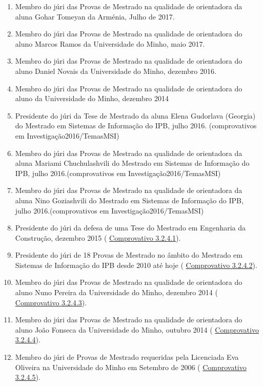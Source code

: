 \documentclass[11pt]{article}
\begin{document}
\begin{enumerate}
\item{Membro do júri das Provas de Mestrado  na qualidade de orientadora da aluna Gohar Tomeyan da Arménia, Julho de 2017.}
\item{Membro do júri das Provas de Mestrado na qualidade de orientadora do aluno Marcos Ramos da Universidade do Minho, maio 2017.}
\item{Membro do júri das Provas de Mestrado na qualidade de orientadora do aluno Daniel Novais da Universidade do Minho, dezembro 2016.}
\item{Membro do júri das Provas de Mestrado na qualidade de orientadora do aluno  da Universidade do Minho, dezembro 2014 }
\item{Presidente do júri da Tese de Mestrado da aluna Elena Gudorlava (Georgia) do Mestrado em Sistemas de Informação do IPB, julho 2016. (comprovativos em Investigação2016/TemasMSI)}
\item{Membro do júri das Provas de Mestrado na qualidade de orientadora da aluna Mariami Chuchulashvili do Mestrado em Sistemas de Informação do IPB, julho 2016.(comprovativos em Investigação2016/TemasMSI)}
\item{Membro do júri das Provas de Mestrado na qualidade de orientadora da aluna Nino Goziashvili do Mestrado em Sistemas de Informação do IPB, julho 2016.(comprovativos em Investigação2016/TemasMSI)}
\item{Presidente do júri da defesa de uma Tese do Mestrado em Engenharia da Construção, dezembro 2015 (
\href{run:JuriProvas/PresidenteMEC.pdf}{Comprovativo 3.2.4.1}).}
\item{Presidente do júri de 18 Provas de Mestrado no âmbito do Mestrado em Sistemas de Informação do IPB desde 2010 até hoje (
\href{run:JuriProvas/TeseMSI.pdf}{Comprovativo 3.2.4.2}).}
\item{Membro do júri das Provas de Mestrado na qualidade de orientadora do aluno Nuno Pereira da Universidade do Minho, dezembro 2014 (
\href{run:JuriProvas/juriNunoPereira.pdf}{Comprovativo 3.2.4.3}).}
\item{Membro do júri das Provas de Mestrado na qualidade de orientadora do aluno João Fonseca da Universidade do Minho, outubro 2014 (
\href{run:JuriProvas/juriJoaoFonseca.pdf}{Comprovativo 3.2.4.4}).}
\item{Membro do júri de Provas de Mestrado requeridas pela Licenciada Eva Oliveira na Universidade do Minho em Setembro de 2006 (
\href{run:JuriProvas/JuriMestradoEva.pdf}{Comprovativo 3.2.4.5}).}
\end{enumerate}
\end{document}
